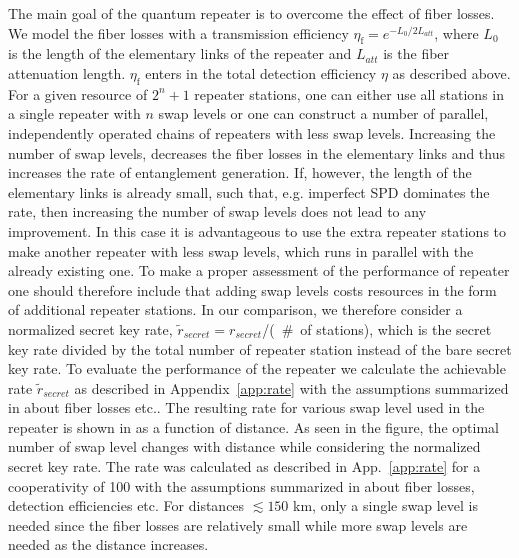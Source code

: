 The main goal of the quantum repeater is to overcome the effect of fiber losses.
We model the fiber losses with a transmission efficiency
$\eta_{\text{f}}=e^{-L_{0}/2L_{att}}$, where $L_{0}$ is the length of the
elementary links of the repeater and $L_{att}$ is the fiber attenuation length.
$\eta_{\text{f}}$ enters in the total detection efficiency $\eta$ as described
above. For a given resource of $2^{n}+1$ repeater stations, one can either use
all stations in a single repeater with $n$ swap levels or one can construct a
number of parallel, independently operated chains of repeaters with less swap
levels. Increasing the number of swap levels, decreases the fiber losses in the
elementary links and thus increases the rate of entanglement generation. If,
however, the length of the elementary links is already small, such that, e.g.
imperfect SPD dominates the rate, then increasing the number of swap levels does
not lead to any improvement. In this case it is advantageous to use the extra
repeater stations to make another repeater with less swap levels, which runs in
parallel with the already existing one. To make a proper assessment of the
performance of repeater one should therefore include that adding swap levels
costs resources in the form of additional repeater stations. In our comparison,
we therefore consider a normalized secret key rate,
$\tilde{r}_{secret}=r_{secret}$/(~\#~of stations), which is the secret key rate
divided by the total number of repeater station instead of the bare secret key
rate. To evaluate the performance of the repeater we calculate the achievable
rate $\tilde r_{secret}$ as described in Appendix~\ref{app:rate} with the
assumptions summarized in  about fiber losses etc.. The
resulting rate for various swap level used in the repeater is shown in
 as a function of distance. As seen in the figure, the
optimal number of swap level changes with distance while considering the
normalized secret key rate. The rate was calculated as described in
App.~\ref{app:rate} for a cooperativity of 100 with the assumptions summarized
in  about fiber losses, detection efficiencies etc. For
distances $\lesssim 150$ km, only a single swap level is needed since the fiber
losses are relatively small while more swap levels are needed as the distance
increases.

